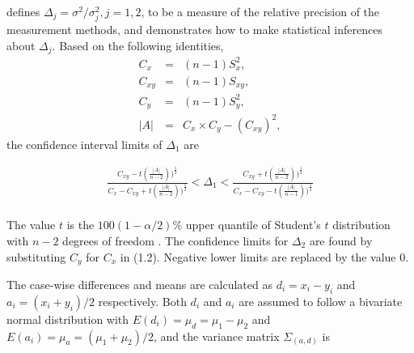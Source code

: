 \documentclass[12pt, a4paper]{report}
\theoremstyle{plain}
\theoremstyle{definition}
\theoremstyle{remark}
\begin{document}
			
	\citet{Thompson} defines $\Delta_j = \sigma^2 / \sigma^2_j, j=1,2$, to be a measure of the
	relative precision of the measurement methods, and demonstrates how to make statistical inferences about $\Delta_{j}$.
	Based on the following identities,
	\begin{eqnarray*}
		C_{x}&=&(n-1)S^2_{x},\nonumber\\
		C_{xy}&=&(n-1)S_{xy},\nonumber\\
		C_{y}&=&(n-1)S^2_{y},\nonumber\\
		|A| &=& C_{x}\times C_{y} - (C_{xy})^2,\nonumber
	\end{eqnarray*}
	\noindent the confidence interval limits of $\Delta_{1}$ are
	
	\begin{eqnarray}
	\frac{C_{xy}-
		t(\frac{|A|}{n-2}))^{\frac{1}{2}}}{C_{x}-C_{xy}+
		t(\frac{|A|}{n-2}))^{\frac{1}{2}}} <
	\Delta_{1} < \frac{C_{xy}+
		t(\frac{|A|}{n-2}))^{\frac{1}{2}}}{C_{x}-C_{xy}-
		t(\frac{|A|}{n-1}))^{\frac{1}{2}}} \nonumber
	\end{eqnarray}
	\\ The value $t$ is the $100(1-\alpha/2)\%$ upper quantile of
	Student's $t$ distribution with $n-2$ degrees of freedom
	\citep{Kinsella}. The confidence limits for $\Delta_{2}$ are found by substituting $C_{y}$ for $C_{x}$ in (1.2).
	Negative lower limits are replaced by the value $0$.
	
	
	
	
	The case-wise differences and means are calculated as $d_{i} =
	x_{i}-y_{i}$ and $a_{i} = (x_{i}+y_{i})/2$  respectively. Both
	$d_{i}$ and $a_{i}$ are assumed to follow a bivariate normal
	distribution with $E(d_{i})= \mu_{d} = \mu_{1} - \mu_{2}$ and
	$E(a_{i})= \mu_{a} = (\mu_{1} + \mu_{2})/2$, and the variance matrix
	$\Sigma_{(a,d)}$ is
	
\end{document}
